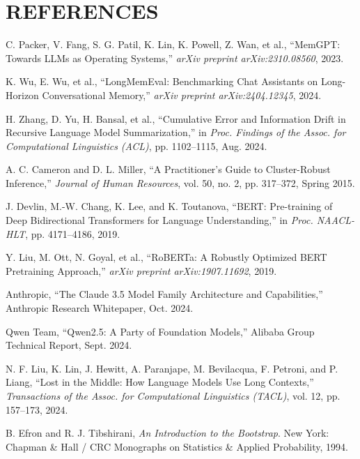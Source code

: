 \documentclass[12pt,a4paper]{report}
\begin{document}
\chapter*{REFERENCES}

\begin{enumerate}[label={[\arabic*]}]
    \item C. Packer, V. Fang, S. G. Patil, K. Lin, K. Powell, Z. Wan, et al., ``MemGPT: Towards LLMs as Operating Systems,'' \textit{arXiv preprint arXiv:2310.08560}, 2023.
    \item K. Wu, E. Wu, et al., ``LongMemEval: Benchmarking Chat Assistants on Long-Horizon Conversational Memory,'' \textit{arXiv preprint arXiv:2404.12345}, 2024.
    \item H. Zhang, D. Yu, H. Bansal, et al., ``Cumulative Error and Information Drift in Recursive Language Model Summarization,'' in \textit{Proc. Findings of the Assoc. for Computational Linguistics (ACL)}, pp. 1102--1115, Aug. 2024.
    \item A. C. Cameron and D. L. Miller, ``A Practitioner's Guide to Cluster-Robust Inference,'' \textit{Journal of Human Resources}, vol. 50, no. 2, pp. 317--372, Spring 2015.
    \item J. Devlin, M.-W. Chang, K. Lee, and K. Toutanova, ``BERT: Pre-training of Deep Bidirectional Transformers for Language Understanding,'' in \textit{Proc. NAACL-HLT}, pp. 4171--4186, 2019.
    \item Y. Liu, M. Ott, N. Goyal, et al., ``RoBERTa: A Robustly Optimized BERT Pretraining Approach,'' \textit{arXiv preprint arXiv:1907.11692}, 2019.
    \item Anthropic, ``The Claude 3.5 Model Family Architecture and Capabilities,'' Anthropic Research Whitepaper, Oct. 2024.
    \item Qwen Team, ``Qwen2.5: A Party of Foundation Models,'' Alibaba Group Technical Report, Sept. 2024.
    \item N. F. Liu, K. Lin, J. Hewitt, A. Paranjape, M. Bevilacqua, F. Petroni, and P. Liang, ``Lost in the Middle: How Language Models Use Long Contexts,'' \textit{Transactions of the Assoc. for Computational Linguistics (TACL)}, vol. 12, pp. 157--173, 2024.
    \item B. Efron and R. J. Tibshirani, \textit{An Introduction to the Bootstrap}. New York: Chapman \& Hall / CRC Monographs on Statistics \& Applied Probability, 1994.
\end{enumerate}
\end{document}

